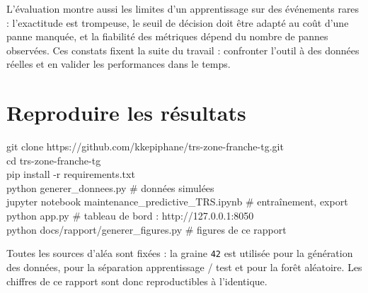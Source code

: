 \documentclass[11pt,a4paper]{article}
\newcommand{\code}[1]{\texttt{#1}}
\begin{document}
L'évaluation montre aussi les limites d'un apprentissage sur des événements rares : l'exactitude
est trompeuse, le seuil de décision doit être adapté au coût d'une panne manquée, et la fiabilité
des métriques dépend du nombre de pannes observées. Ces constats fixent la suite du travail :
confronter l'outil à des données réelles et en valider les performances dans le temps.

\appendix
\section{Reproduire les résultats}
\begin{tcolorbox}[colback=fond,colframe=fond,arc=2pt,left=8pt,fontupper=\ttfamily\footnotesize]
git clone https://github.com/kkepiphane/trs-zone-franche-tg.git\\
cd trs-zone-franche-tg\\
pip install -r requirements.txt\\[4pt]
python generer\_donnees.py \hfill\textrm{\color{muted}\# données simulées}\\
jupyter notebook maintenance\_predictive\_TRS.ipynb \hfill\textrm{\color{muted}\# entraînement, export}\\
python app.py \hfill\textrm{\color{muted}\# tableau de bord : http://127.0.0.1:8050}\\
python docs/rapport/generer\_figures.py \hfill\textrm{\color{muted}\# figures de ce rapport}
\end{tcolorbox}

Toutes les sources d'aléa sont fixées : la graine \code{42} est utilisée pour la génération des
données, pour la séparation apprentissage / test et pour la forêt aléatoire. Les chiffres de ce
rapport sont donc reproductibles à l'identique.
\end{document}

